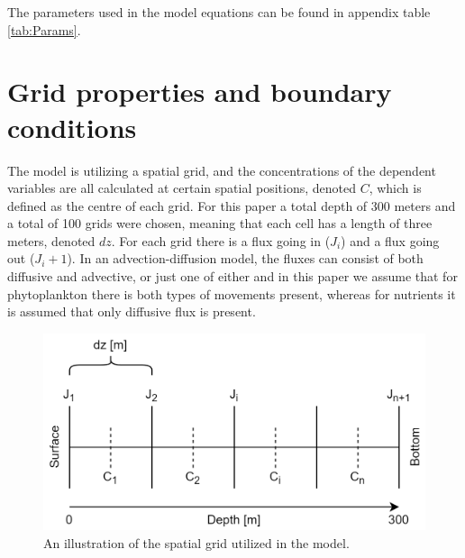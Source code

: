 The parameters used in the model equations can be found in appendix table \ref{tab:Params}.

\section{Grid properties and boundary conditions} \label{GridDescrip}
The model is utilizing a spatial grid, and the concentrations of the dependent variables are all calculated at certain spatial positions, denoted $C$, which is defined as the centre of each grid. For this paper a total depth of 300 meters and a total of 100 grids were chosen, meaning that each cell has a length of three meters, denoted $dz$. For each grid there is a flux going in ($J_{i}$) and a flux going out ($J_i+1$). In an advection-diffusion model, the fluxes can consist of both diffusive and advective, or just one of either and in this paper we assume that for phytoplankton there is both types of movements present, whereas for nutrients it is assumed that only diffusive flux is present.
\begin{figure}[h]
\centering
\includegraphics[width=.8\linewidth]{Pictures/GridProperties.png}
\caption{An illustration of the spatial grid utilized in the model.}
\label{fig:GridProp}
\end{figure}

